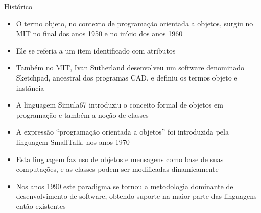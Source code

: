 \begin{frame}[fragile]{Histórico}

    \begin{itemize}
        \item O termo objeto, no contexto de programação orientada a objetos, surgiu no MIT no
            final dos anos 1950 e no início dos anos 1960

        \item Ele se referia a um item identificado com atributos

        \item Também no MIT, Ivan Sutherland desenvolveu um software denominado Sketchpad, ancestral
            dos programas CAD, e definiu os termos objeto e instância

        \item A linguagem Simula67 introduziu o conceito formal de objetos em programação e também
            a noção de classes

        \item A expressão ``programação orientada a objetos'' foi introduzida pela linguagem 
            SmallTalk, nos anos 1970

        \item Esta linguagem faz uso de objetos e mensagens como base de suas computações, e as
            classes podem ser modificadas dinamicamente

        \item Nos anos 1990 este paradigma se tornou a metodologia dominante de desenvolvimento 
            de software, obtendo suporte na maior parte das linguagens então existentes
    \end{itemize}

\end{frame}

